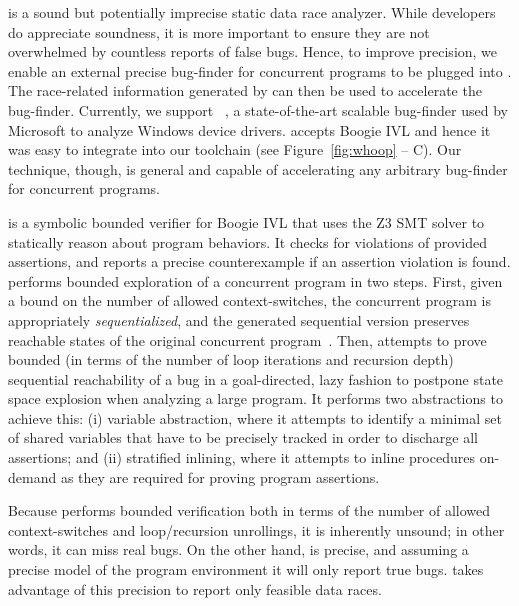 \whoop is a sound but potentially imprecise static data race analyzer.  While developers do appreciate soundness, it is more important to ensure they are not overwhelmed by countless reports of false bugs.  Hence, to improve precision, we enable an external precise bug-finder for concurrent programs to be plugged into \whoop. The race-related information generated by \whoop can then be used to accelerate the bug-finder.  Currently, we support \corral~\cite{lal2012corral, lal2014powering}, a state-of-the-art scalable bug-finder used by Microsoft to analyze Windows device drivers. \corral accepts Boogie IVL and hence it was easy to integrate into our toolchain (see Figure~\ref{fig:whoop} -- C). Our technique, though, is general and capable of accelerating any arbitrary bug-finder for concurrent programs.

\corral is a symbolic bounded verifier for Boogie IVL that uses the Z3 SMT solver to statically reason about program behaviors. It checks for violations of provided assertions, and reports a precise counterexample if an assertion violation is found. \corral performs bounded exploration of a concurrent program in two steps. First, given a bound on the number of allowed context-switches, the concurrent program is appropriately \emph{sequentialized}, and the generated sequential version preserves reachable states of the original concurrent program~\cite{popl2011-eqr,cav2009-lqr,cavLalR08}. Then, \corral attempts to prove bounded (in terms of the number of loop iterations and recursion depth) sequential reachability of a bug in a goal-directed, lazy fashion to postpone state space explosion when analyzing a large program. It performs two abstractions to achieve this: (i) variable abstraction, where it attempts to identify a minimal set of shared variables that have to be precisely tracked in order to discharge all assertions; and (ii) stratified inlining, where it attempts to inline procedures on-demand as they are required for proving program assertions.

Because \corral performs bounded verification both in terms of the number of allowed context-switches and loop/recursion unrollings, it is inherently unsound; in other words, it can miss real bugs. On the other hand, \corral is precise, and assuming a precise model of the program environment it will only report true bugs. \whoop takes advantage of this precision to report only feasible data races.

